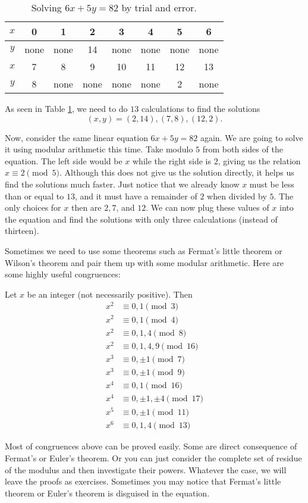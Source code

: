 \documentclass{subfile}
\begin{document}
\begin{table}[h]
\centering
\begin{tabular}{|c|c|c|c|c|c|c|c|}
\hline
$x$ & 0 & 1 & 2 & 3 & 4 & 5 & 6 \\
\hline
$y$ & none & none & 14 & none & none & none & none \\
\hline
$x$ & 7 & 8 & 9 & 10 & 11 & 12 & 13 \\
\hline
$y$ & 8 & none & none & none & none & 2 & none \\
\hline
\end{tabular}
\caption{Solving $6x+5y=82$ by trial and error.}
\label{table:diophantine}
\end{table}

			As seen in Table \ref{table:diophantine}, we need to do $13$ calculations to find the solutions $$(x, y)=(2,14), (7,8), (12, 2).$$

			Now, consider the same linear equation $6x+5y = 82$ again. We are going to solve it using modular arithmetic this time. Take modulo $5$ from both sides of the equation. The left side would be $x$ while the right side is $2$, giving us the relation $x \equiv 2 \pmod 5$. Although this does not give us the solution directly, it helps us find the solutions much faster. Just notice that we already know $x$ must be less than or equal to $13$, and it must have a remainder of $2$ when divided by $5$. The only choices for $x$ then are $2, 7$, and $12$. We can now plug these values of $x$ into the equation and find the solutions with only three calculations (instead of thirteen).


			Sometimes we need to use some theorems such as Fermat's little theorem or Wilson's theorem and pair them up with some modular arithmetic. Here are some highly useful congruences:
				\begin{theorem}\label{thm:diophModulo}
					Let $x$ be an integer (not necessarily positive). Then
					\begin{align*}
					x^2 & \equiv 0,1 \pmod3\\
					x^2 & \equiv 0,1 \pmod4\\
					x^2 & \equiv 0,1,4\pmod8\\
					x^2 & \equiv 0,1,4,9 \pmod{16}\\
					x^3 & \equiv 0, \pm1 \pmod7\\
					x^3 & \equiv 0, \pm1 \pmod9\\
					x^4 & \equiv 0,1 \pmod{16}\\
					x^4 & \equiv 0, \pm 1, \pm 4 \pmod{17}\\
					x^5 & \equiv 0, \pm1 \pmod{11}\\
					x^6 & \equiv 0,1,4 \pmod{13}
					\end{align*}
				\end{theorem}
			Most of congruences above can be proved easily. Some are direct consequence of Fermat's or Euler's theorem. Or you can just consider the complete set of residue of the modulus and then investigate their powers. Whatever the case, we will leave the proofs as exercises. Sometimes you may notice that Fermat's little theorem or Euler's theorem is disguised in the equation.
\end{document}
